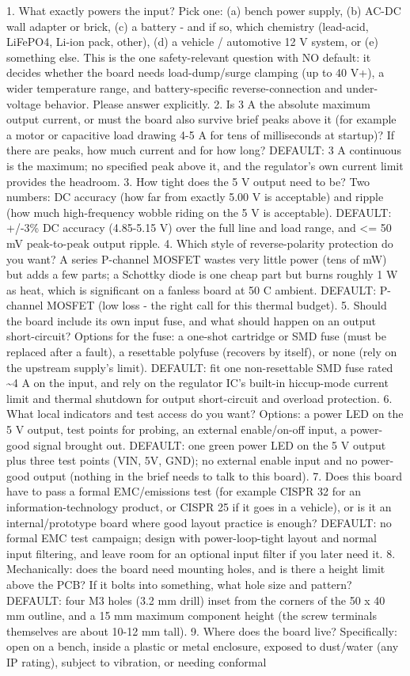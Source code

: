 \documentclass[11pt,a4paper]{article}
\begin{document}
1. What exactly powers the input? Pick one: (a) bench power supply, (b) AC-DC wall adapter or brick, (c) a battery - and if so, which chemistry (lead-acid, LiFePO4, Li-ion pack, other), (d) a vehicle / automotive 12 V system, or (e) something else. This is the one safety-relevant question with NO default: it decides whether the board needs load-dump/surge clamping (up to 40 V+), a wider temperature range, and battery-specific reverse-connection and under-voltage behavior. Please answer explicitly. 2. Is 3 A the absolute maximum output current, or must the board also survive brief peaks above it (for example a motor or capacitive load drawing 4-5 A for tens of milliseconds at startup)? If there are peaks, how much current and for how long? DEFAULT: 3 A continuous is the maximum; no specified peak above it, and the regulator's own current limit provides the headroom. 3. How tight does the 5 V output need to be? Two numbers: DC accuracy (how far from exactly 5.00 V is acceptable) and ripple (how much high-frequency wobble riding on the 5 V is acceptable). DEFAULT: +/-3\% DC accuracy (4.85-5.15 V) over the full line and load range, and \textless{}= 50 mV peak-to-peak output ripple. 4. Which style of reverse-polarity protection do you want? A series P-channel MOSFET wastes very little power (tens of mW) but adds a few parts; a Schottky diode is one cheap part but burns roughly 1 W as heat, which is significant on a fanless board at 50 C ambient. DEFAULT: P-channel MOSFET (low loss - the right call for this thermal budget). 5. Should the board include its own input fuse, and what should happen on an output short-circuit? Options for the fuse: a one-shot cartridge or SMD fuse (must be replaced after a fault), a resettable polyfuse (recovers by itself), or none (rely on the upstream supply's limit). DEFAULT: fit one non-resettable SMD fuse rated \textasciitilde{}4 A on the input, and rely on the regulator IC's built-in hiccup-mode current limit and thermal shutdown for output short-circuit and overload protection. 6. What local indicators and test access do you want? Options: a power LED on the 5 V output, test points for probing, an external enable/on-off input, a power-good signal brought out. DEFAULT: one green power LED on the 5 V output plus three test points (VIN, 5V, GND); no external enable input and no power-good output (nothing in the brief needs to talk to this board). 7. Does this board have to pass a formal EMC/emissions test (for example CISPR 32 for an information-technology product, or CISPR 25 if it goes in a vehicle), or is it an internal/prototype board where good layout practice is enough? DEFAULT: no formal EMC test campaign; design with power-loop-tight layout and normal input filtering, and leave room for an optional input filter if you later need it. 8. Mechanically: does the board need mounting holes, and is there a height limit above the PCB? If it bolts into something, what hole size and pattern? DEFAULT: four M3 holes (3.2 mm drill) inset from the corners of the 50 x 40 mm outline, and a 15 mm maximum component height (the screw terminals themselves are about 10-12 mm tall). 9. Where does the board live? Specifically: open on a bench, inside a plastic or metal enclosure, exposed to dust/water (any IP rating), subject to vibration, or needing conformal 
\end{document}
